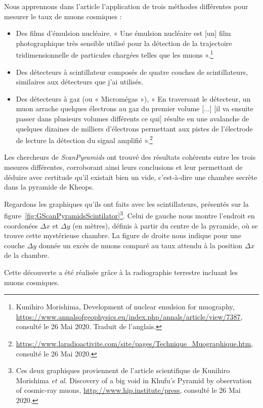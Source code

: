 \documentclass[a4paper, 12pt]{article}
\begin{document}
\begin{spacing}{1.5}
Nous apprennons dans l'article l'application de trois méthodes différentes pour mesurer le taux de muons cosmiques :
\begin{itemize}
  \item Des films d'émulsion nucléaire. « Une émulsion nucléaire est [un] film photographique très sensible utilisé pour la détection de la trajectoire tridimensionnelle de particules chargées telles que les muons ».\footnote{Kunihiro Morishima, Development of nuclear emulsion for muography, \url{https://www.annalsofgeophysics.eu/index.php/annals/article/view/7387}, consulté le 26 Mai 2020. Traduit de l'anglais.}
  \item Des détecteurs à scintillateur composés de quatre couches de scintillateurs, similaires aux détecteurs que j'ai utilisés.
  \item Des détecteurs à gaz (ou « Micromégas »), « En traversant le détecteur, un muon arrache quelques électrons au gaz du premier volume [...] [il va ensuite passer dans plusieurs volumes différents ce qui]  résulte en une avalanche de quelques dizaines de milliers d'électrons permettant aux pistes de l’électrode de lecture la détection du signal amplifié ».\footnote{\url{https://www.laradioactivite.com/site/pages/Technique_Muographique.htm}, consulté le 26 Mai 2020.}
\end{itemize}

Les chercheurs de \emph{ScanPyramids} ont trouvé des résultats cohérents entre les trois mesures différentes, corroborant ainsi leurs conclusions et leur permettant de déduire avec certitude qu'il existait bien un vide, c'est-à-dire une chambre secrète dans la pyramide de Kheops.

Regardons les graphiques qu'ils ont faits avec les scintillateurs, présentés sur la figure~\ref{fig:GScanPyramidsScintilator}\footnote{Ces deux graphiques proviennent de l'article scientifique de Kunihiro Morishima \emph{et al.} Discovery of a big void in Khufu's Pyramid by observation of cosmic-ray muons, \url{http://www.hip.institute/press}, consulté le 26 Mai 2020.}. Celui de gauche nous montre l'endroit en coordonées $\Delta x$ et $\Delta y$ (en mètres), définis à partir du centre de la pyramide, où se trouve cette mystérieuse chambre. La figure de droite nous indique pour une couche $\Delta y$ donnée un excès de muons comparé au taux attendu à la position $\Delta x$ de la chambre.

Cette découverte a été réalisée grâce à la radiographie terrestre incluant les muons cosmiques.


\end{spacing}
\end{document}
